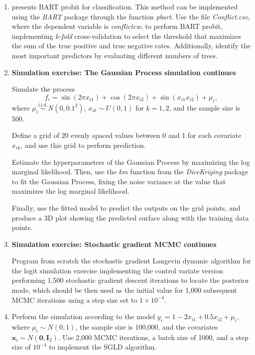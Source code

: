 \begin{enumerate}
	\item \cite{chipman2010bart} presents BART probit for classification. This method can be implemented using the \textit{BART} package through the function \textit{pbart}. Use the file \textit{Conflict.csv}, where the dependent variable is \textit{conflictcw}, to perform BART probit, implementing \textit{k-fold} cross-validation to select the threshold that maximizes the sum of the true positive and true negative rates. Additionally, identify the most important predictors by evaluating different numbers of trees.
	
	
	\item \textbf{Simulation exercise: The Gaussian Process simulation continues}
	
	Simulate the process
	\[
	f_i = \sin(2\pi x_{i1}) + \cos(2\pi x_{i2}) + \sin(x_{i1} x_{i2}) + \mu_i,
	\]
	where \( \mu_i \overset{\text{i.i.d.}}{\sim} {N}(0, 0.1^2) \), \( x_{ik} \sim {U}(0,1) \) for \( k = 1, 2 \), and the sample size is 500. 
	
	Define a grid of 20 evenly spaced values between 0 and 1 for each covariate \( x_{ik} \), and use this grid to perform prediction.
	
	Estimate the hyperparameters of the Gaussian Process by maximizing the log marginal likelihood. Then, use the \textit{km} function from the \textit{DiceKriging} package to fit the Gaussian Process, fixing the noise variance at the value that maximizes the log marginal likelihood.
	
	Finally, use the fitted model to predict the outputs on the grid points, and produce a 3D plot showing the predicted surface along with the training data points.
	
	\item \textbf{Simulation exercise: Stochastic gradient MCMC continues} 
	
	Program from scratch the stochastic gradient Langevin dynamic algorithm for the logit simulation exercise implementing the control variate version performing 1{,}500 stochastic gradient descent iterations to locate the posterior mode, which should be then used as the initial value for 1{,}000 subsequent MCMC iterations using a step size set to \(1 \times 10^{-4}\).
	
	\item Perform the simulation according to the model \( y_i = 1 - 2 x_{i1} + 0.5 x_{i2} + \mu_i \), where \( \mu_i \sim {N}(0,1) \), the sample size is 100,000, and the covariates \( \mathbf{x}_i \sim {N}(\mathbf{0}, \mathbf{I}_2) \). Use 2,000 MCMC iterations, a batch size of 1000, and a step size of \( 10^{-4} \) to implement the SGLD algorithm.
	
	
	  
\end{enumerate}

